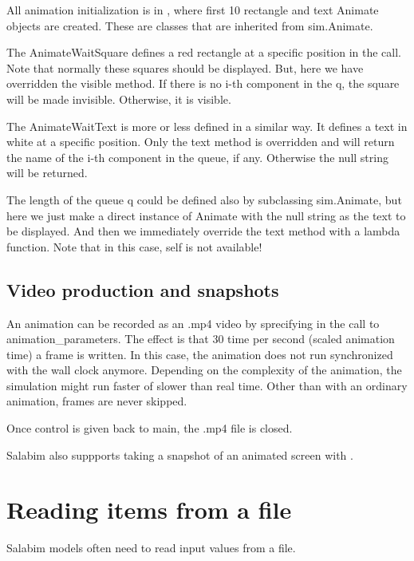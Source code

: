 \documentclass[letterpaper,10pt,english]{sphinxmanual}
\begin{document}
All animation initialization is in , where first 10 rectangle and text Animate
objects are created. These are classes that are inherited from sim.Animate.

The AnimateWaitSquare defines a red rectangle at a specific position in the  call.
Note that normally these squares should be displayed. But, here we have overridden the visible method.
If there is no i-th component in the q, the square will be made invisible. Otherwise, it is visible.

The AnimateWaitText is more or less defined in a similar way. It defines a text in white at a specific position.
Only the text method is overridden and will return the name of the i-th component in the queue, if any. Otherwise
the null string will be returned.

The length of the queue q could be defined also by subclassing sim.Animate, but here we just make a direct instance
of Animate with the null string as the text to be displayed. And then we immediately override the text method with
a lambda function. Note that in this case, self is not available!


\section{Video production and snapshots}
\label{\detokenize{Animation:video-production-and-snapshots}}
An animation can be recorded as an .mp4 video by sprecifying  in the call to animation\_parameters.
The effect is that 30 time per second (scaled animation time) a frame is written. In this case, the animation does not
run synchronized with the wall clock anymore. Depending on the complexity of the animation, the simulation might run
faster of slower than real time. Other than with an ordinary animation, frames are never skipped.

Once control is given back to main, the .mp4 file is closed.

Salabim also suppports taking a snapshot of an animated screen with .


\chapter{Reading items from a file}
\label{\detokenize{Reading items from a file::doc}}\label{\detokenize{Reading items from a file:reading-items-from-a-file}}
Salabim models often need to read input values from a file.
\end{document}
